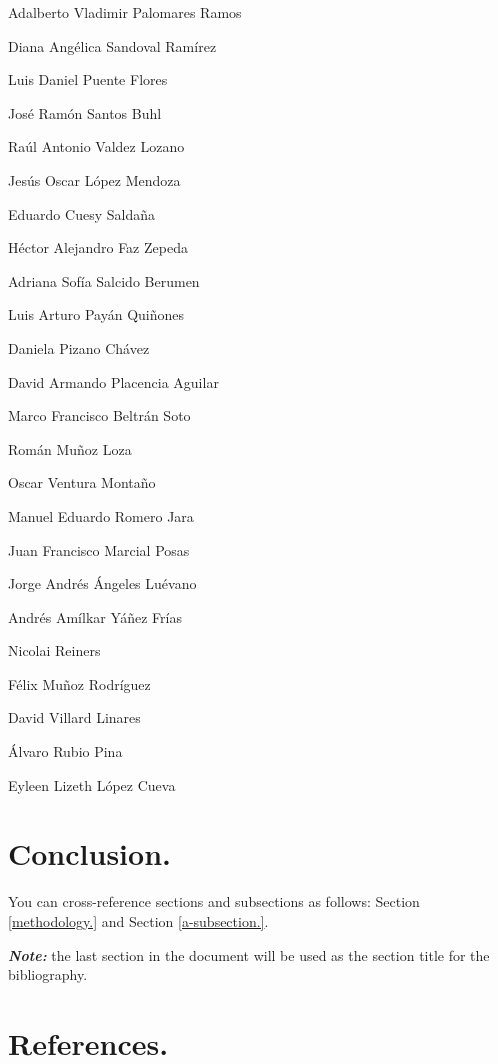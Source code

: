 \documentclass[12pt,halfline,a4paper,]{ouparticle}
\begin{document}
Adalberto Vladimir Palomares Ramos

Diana Angélica Sandoval Ramírez

Luis Daniel Puente Flores

José Ramón Santos Buhl

Raúl Antonio Valdez Lozano

Jesús Oscar López Mendoza

Eduardo Cuesy Saldaña

Héctor Alejandro Faz Zepeda

Adriana Sofía Salcido Berumen

Luis Arturo Payán Quiñones

Daniela Pizano Chávez

David Armando Placencia Aguilar

Marco Francisco Beltrán Soto

Román Muñoz Loza

Oscar Ventura Montaño

Manuel Eduardo Romero Jara

Juan Francisco Marcial Posas

Jorge Andrés Ángeles Luévano

Andrés Amílkar Yáñez Frías

Nicolai Reiners

Félix Muñoz Rodríguez

David Villard Linares

Álvaro Rubio Pina

Eyleen Lizeth López Cueva

\hypertarget{conclusion.}{%
\section{Conclusion.}\label{conclusion.}}

You can cross-reference sections and subsections as follows: Section
\ref{methodology.} and Section \ref{a-subsection.}.

\textbf{\emph{Note:}} the last section in the document will be used as
the section title for the bibliography.

\hypertarget{references.}{%
\section*{References.}\label{references.}}
\end{document}
